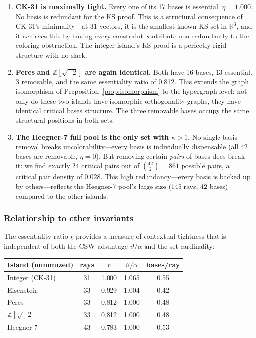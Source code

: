 \documentclass[12pt,a4paper]{article}
\newcommand{\R}{\mathbb{R}}
\newcommand{\Z}{\mathbb{Z}}
\begin{document}
\begin{enumerate}
    \item \textbf{CK-31 is maximally tight.} Every one of its 17 bases is essential: $\eta = 1.000$. No basis is redundant for the KS proof. This is a structural consequence of CK-31's minimality---at 31 vectors, it is the smallest known KS set in $\R^3$, and it achieves this by having every constraint contribute non-redundantly to the coloring obstruction. The integer island's KS proof is a perfectly rigid structure with no slack.

    \item \textbf{Peres and $\Z[\sqrt{-2}]$ are again identical.} Both have 16 bases, 13 essential, 3 removable, and the same essentiality ratio of 0.812. This extends the graph isomorphism of Proposition~\ref{prop:isomorphism} to the hypergraph level: not only do these two islands have isomorphic orthogonality graphs, they have identical critical bases structure. The three removable bases occupy the same structural positions in both sets.

    \item \textbf{The Heegner-7 full pool is the only set with $\kappa > 1$.} No single basis removal breaks uncolorability---every basis is individually dispensable (all 42 bases are removable, $\eta = 0$). But removing certain \emph{pairs} of bases does break it: we find exactly 24 critical pairs out of $\binom{42}{2} = 861$ possible pairs, a critical pair density of $0.028$. This high redundancy---every basis is backed up by others---reflects the Heegner-7 pool's large size (145 rays, 42 bases) compared to the other islands.
\end{enumerate}

\subsubsection{Relationship to other invariants}

The essentiality ratio $\eta$ provides a measure of contextual tightness that is independent of both the CSW advantage $\vartheta/\alpha$ and the set cardinality:

\begin{center}
\begin{tabular}{lcccc}
\toprule
Island (minimized) & rays & $\eta$ & $\vartheta/\alpha$ & bases/ray \\
\midrule
Integer (CK-31) & 31 & 1.000 & 1.065 & 0.55 \\
Eisenstein & 33 & 0.929 & 1.004 & 0.42 \\
Peres & 33 & 0.812 & 1.000 & 0.48 \\
$\Z[\sqrt{-2}]$ & 33 & 0.812 & 1.000 & 0.48 \\
Heegner-7 & 43 & 0.783 & 1.000 & 0.53 \\
\bottomrule
\end{tabular}
\end{center}
\end{document}
